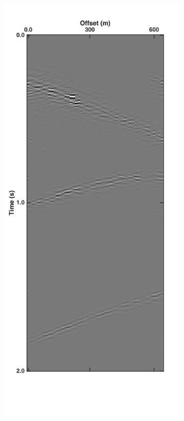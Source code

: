 \begin{figure}
\begin{subfigure}[t]{0.24\textwidth}
		\caption{}
		\label{fig:Ch-Results-Unbl-inline10}
	\end{subfigure}
	\centering
	\begin{subfigure}[t]{0.24\textwidth}
		\centering
		\includegraphics[height = 0.38\textheight]{Plots/BlendingPatterns/Deblended_inline10x}

\end{subfigure}
\end{figure}
